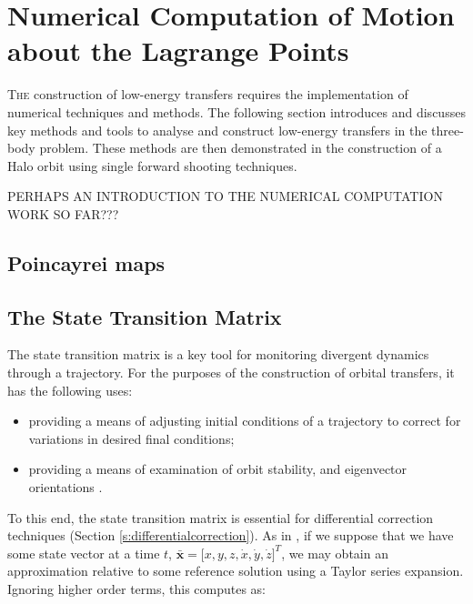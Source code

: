                                                                                                                                                                                                                                                                                                                                                                                                                                                                                                                
\chapter{Numerical Computation of Motion about the Lagrange Points}

\lettrine{T}{he} construction of low-energy transfers requires the implementation of numerical techniques and methods. The following section introduces and discusses key methods and tools to analyse and construct low-energy transfers in the three-body problem. These methods are then demonstrated in the construction of a Halo orbit using single forward shooting techniques.

PERHAPS AN INTRODUCTION TO THE NUMERICAL COMPUTATION WORK SO FAR???

\section{Poincayrei maps}

\section{The State Transition Matrix}

The state transition matrix is a key tool for monitoring divergent dynamics through a trajectory. For the purposes of the construction of orbital transfers, it has the following uses:

\begin{itemize}
\item  providing a means of adjusting initial conditions of a trajectory to correct for variations in desired final conditions;
\item providing a means of examination of orbit stability, and eigenvector orientations \citep{Parker2014}.
\end{itemize}

 To this end, the state transition matrix is essential for differential correction techniques (Section \ref{s:differentialcorrection}). As in \citep{Howell1997}, if we suppose that we have some state vector at a time $t$, $\pmb{\bar{x}} = [ x, y, z, \dot{x}, \dot{y}, \dot{z} \big ]^T$, we may obtain an approximation relative to some reference solution using a Taylor series expansion. Ignoring higher order terms, this computes as:
 
